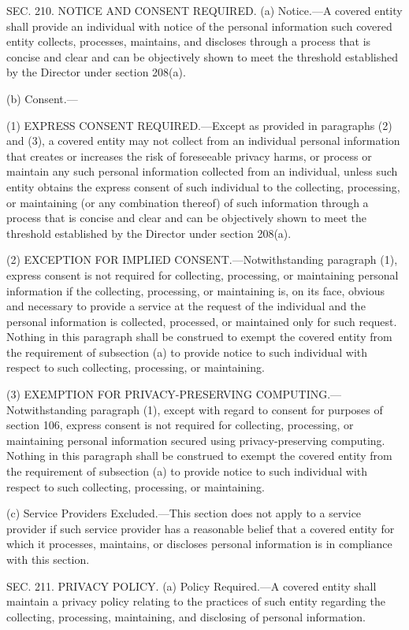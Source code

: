SEC. 210. NOTICE AND CONSENT REQUIRED.
(a) Notice.—A covered entity shall provide an individual with notice of the personal information such covered entity collects, processes, maintains, and discloses through a process that is concise and clear and can be objectively shown to meet the threshold established by the Director under section 208(a).

(b) Consent.—

(1) EXPRESS CONSENT REQUIRED.—Except as provided in paragraphs (2) and (3), a covered entity may not collect from an individual personal information that creates or increases the risk of foreseeable privacy harms, or process or maintain any such personal information collected from an individual, unless such entity obtains the express consent of such individual to the collecting, processing, or maintaining (or any combination thereof) of such information through a process that is concise and clear and can be objectively shown to meet the threshold established by the Director under section 208(a).

(2) EXCEPTION FOR IMPLIED CONSENT.—Notwithstanding paragraph (1), express consent is not required for collecting, processing, or maintaining personal information if the collecting, processing, or maintaining is, on its face, obvious and necessary to provide a service at the request of the individual and the personal information is collected, processed, or maintained only for such request. Nothing in this paragraph shall be construed to exempt the covered entity from the requirement of subsection (a) to provide notice to such individual with respect to such collecting, processing, or maintaining.

(3) EXEMPTION FOR PRIVACY-PRESERVING COMPUTING.—Notwithstanding paragraph (1), except with regard to consent for purposes of section 106, express consent is not required for collecting, processing, or maintaining personal information secured using privacy-preserving computing. Nothing in this paragraph shall be construed to exempt the covered entity from the requirement of subsection (a) to provide notice to such individual with respect to such collecting, processing, or maintaining.

(c) Service Providers Excluded.—This section does not apply to a service provider if such service provider has a reasonable belief that a covered entity for which it processes, maintains, or discloses personal information is in compliance with this section.


SEC. 211. PRIVACY POLICY.
(a) Policy Required.—A covered entity shall maintain a privacy policy relating to the practices of such entity regarding the collecting, processing, maintaining, and disclosing of personal information.

